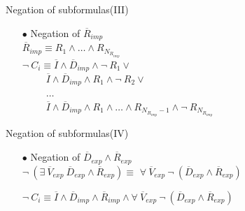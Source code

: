 \documentclass[pdf,slideColor,contemporain]{prosper}
\begin{document}
\begin{slide}{Negation of subformulas(III)}
     \begin{itemize}
        \item[{\blue$\bullet$}] Negation of $\overline{R}_{imp}$ \\
\vspace{0.6cm}
$\overline{R}_{imp} \equiv R_1
           \wedge \ldots \wedge R_{N_{R_{imp}}}$\\

\vspace{0.8cm}
{\blue
           $ \neg ~ C_i  \equiv \overline{I} \wedge \overline{D}_{imp} \wedge \neg~ R_1  \vee$ \\ 
           $~~~~~~~~~~~ \overline{I} \wedge \overline{D}_{imp} \wedge
           R_1 \wedge \neg~ R_2  \vee$ \\ 
           $~~~~~~~~~~~ \ldots $ \\ 
           $~~~~~~~~~~~ \overline{I} \wedge \overline{D}_{imp} \wedge
           R_1 \wedge \ldots \wedge R_{N_{R_{imp}}-1} \wedge \neg~
           R_{N_{R_{imp}}}$ \\ 

}
     \end{itemize}
\end{slide}

\begin{slide}{Negation of subformulas(IV)}
     \begin{itemize}
        \item[{\blue$\bullet$}] Negation of $\overline{D}_{exp} \wedge
           \overline{R}_{exp}$ \\
\vspace{1cm}
$ \neg~ (\exists~ \overline{V}_{exp}~
           \overline{D}_{exp} \wedge \overline{R}_{exp} ) \equiv $
$\forall~ \overline{V}_{exp}~ \neg ~(\overline{D}_{exp}
           \wedge \overline{R}_{exp})$\\

\vspace{1.1cm}
{\blue
           $ \neg ~ C_i  \equiv \overline{I} \wedge \overline{D}_{imp}
           \wedge \overline{R}_{imp} \wedge \forall~
           \overline{V}_{exp}~ \neg~(\overline{D}_{exp} \wedge
           \overline{R}_{exp})$

}
     \end{itemize}
\end{slide}
\end{document}
